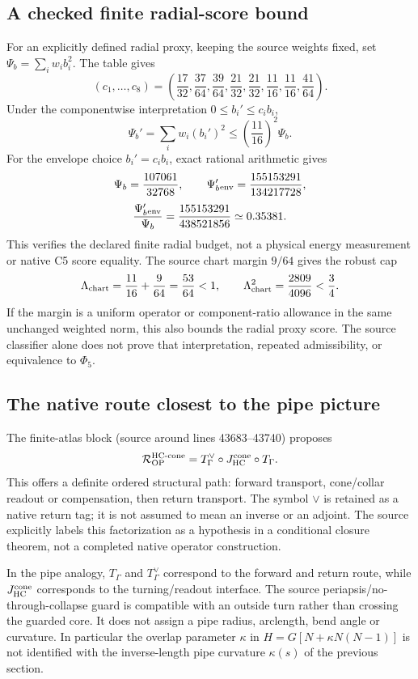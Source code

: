 \documentclass[11pt,a4paper]{article}
\begin{document}
\subsection{A checked finite radial-score bound}
For an explicitly defined radial proxy, keeping the source weights fixed,
set $\Psi_b=\sum_i w_i b_i^2$. The table gives
\[
(c_1,\ldots,c_8)=
\left(\frac{17}{32},\frac{37}{64},\frac{39}{64},\frac{21}{32},
\frac{21}{32},\frac{11}{16},\frac{11}{16},\frac{41}{64}\right).
\]
Under the componentwise interpretation $0\le b_i'\le c_i b_i$,
\[
\Psi_b'=\sum_iw_i(b_i')^2
\le\left(\frac{11}{16}\right)^2\Psi_b.
\]
For the envelope choice $b_i'=c_i b_i$, exact rational arithmetic gives
\[
\Psi_b=\frac{107061}{32768},\qquad
\Psi_b'{}_{\rm env}=\frac{155153291}{134217728},
\]
\[
\frac{\Psi_b'{}_{\rm env}}{\Psi_b}
=\frac{155153291}{438521856}\simeq0.35381.
\]
This verifies the declared finite radial budget, not a physical energy
measurement or native C5 score equality.
The source chart margin $9/64$ gives the robust cap
\[
\Lambda_{\rm chart}=\frac{11}{16}+\frac9{64}=\frac{53}{64}<1,
\qquad \Lambda_{\rm chart}^2=\frac{2809}{4096}<\frac34.
\]
If the margin is a uniform operator or component-ratio allowance in the
same unchanged weighted norm, this also bounds the radial proxy score.
The source classifier alone does not prove that interpretation, repeated
admissibility, or equivalence to $\Phi_5$.

\subsection{The native route closest to the pipe picture}
The finite-atlas block (source around lines 43683--43740) proposes
\[
\mathcal R_{\rm OP}^{\rm HC\text{-}cone}
=T_\Gamma^{\vee}\circ J_{\rm HC}^{\rm cone}\circ T_\Gamma.
\]
This offers a definite ordered structural path: forward transport,
cone/collar readout or compensation, then return transport. The symbol
$\vee$ is retained as a native return tag; it is not assumed to mean an
inverse or an adjoint. The source explicitly labels this factorization as
a hypothesis in a conditional closure theorem, not a completed native
operator construction.

In the pipe analogy, $T_\Gamma$ and $T_\Gamma^\vee$ correspond to the
forward and return route, while $J_{\rm HC}^{\rm cone}$ corresponds to
the turning/readout interface. The source periapsis/no-through-collapse
guard is compatible with an outside turn rather than crossing the guarded
core. It does not assign a pipe radius, arclength, bend angle or curvature.
In particular the overlap parameter $\kappa$ in
$H=G[N+\kappa N(N-1)]$ is not identified with the inverse-length
pipe curvature $\kappa(s)$ of the previous section.
\end{document}
